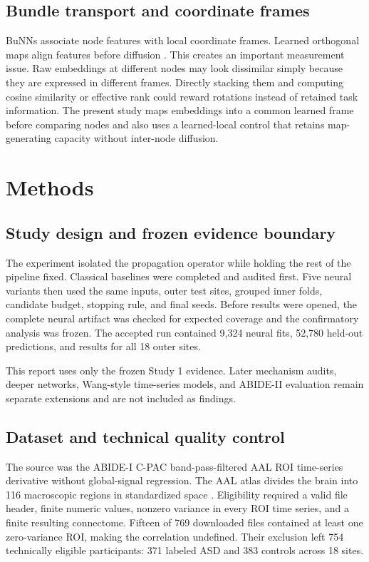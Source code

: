 \documentclass[11pt,a4paper]{article}
\begin{document}
\subsection{Bundle transport and coordinate frames}

BuNNs associate node features with local coordinate frames. Learned
orthogonal maps align features before diffusion \cite{bamberger2025bundle}.
This creates an important measurement issue. Raw embeddings at different
nodes may look dissimilar simply because they are expressed in different
frames. Directly stacking them and computing cosine similarity or effective
rank could reward rotations instead of retained task information. The present
study maps embeddings into a common learned frame before comparing nodes and
also uses a learned-local control that retains map-generating capacity without
inter-node diffusion.

\section{Methods}

\subsection{Study design and frozen evidence boundary}

The experiment isolated the propagation operator while holding the rest of
the pipeline fixed. Classical baselines were completed and audited first. Five
neural variants then used the same inputs, outer test sites, grouped inner
folds, candidate budget, stopping rule, and final seeds. Before results were
opened, the complete neural artifact was checked for expected coverage and the
confirmatory analysis was frozen. The accepted run contained 9,324 neural
fits, 52,780 held-out predictions, and results for all 18 outer sites.

This report uses only the frozen Study 1 evidence. Later mechanism audits,
deeper networks, Wang-style time-series models, and ABIDE-II evaluation remain
separate extensions and are not included as findings.

\subsection{Dataset and technical quality control}

The source was the ABIDE-I C-PAC band-pass-filtered AAL ROI time-series
derivative without global-signal regression. The AAL atlas divides the brain
into 116 macroscopic regions in standardized space \cite{tzourio2002aal}.
Eligibility required a valid file header, finite numeric values, nonzero
variance in every ROI time series, and a finite resulting connectome. Fifteen
of 769 downloaded files contained at least one zero-variance ROI, making the
correlation undefined. Their exclusion left 754 technically eligible
participants: 371 labeled ASD and 383 controls across 18 sites.
\end{document}
